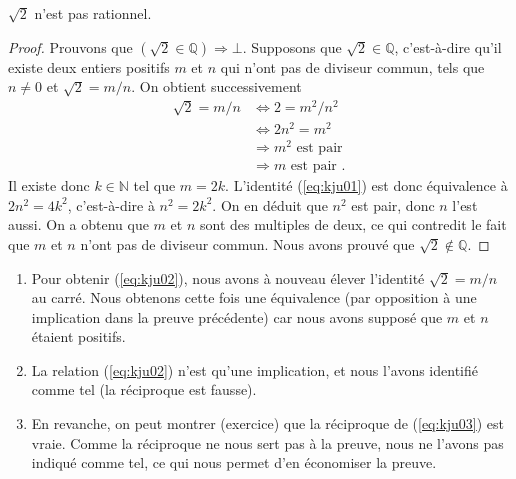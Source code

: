\documentclass[french,course,oneside,theoremnosection]{lecture}
\newcommand{\N}{\mathbb{N}}
\newcommand{\Q}{\mathbb{Q}}
\newcommand{\iimplies}{\Rightarrow}
\newcommand{\ifff}{\Leftrightarrow}
\begin{document}
\begin{example}
$\sqrt{2}$ n'est pas rationnel.
\end{example}
\begin{proof}
Prouvons que $(\sqrt{2} \in \Q) \iimplies \bot$. Supposons que $\sqrt{2}\in \Q$, c'est-à-dire qu'il existe deux entiers positifs $m$ et $n$ qui n'ont pas de diviseur commun, tels que $n\neq 0$ et $\sqrt{2}=m/n$. On obtient successivement
\begin{align}
\sqrt{2}=m/n & \ifff 2=m^2/n^2 \label{eq:kju00}\\
 & \ifff 2n^2=m^2\label{eq:kju01}\\
 & \iimplies m^2 \text{ est pair }\label{eq:kju02}\\
 & \iimplies m \text{ est pair }.\label{eq:kju03}
\end{align}
Il existe donc $k\in \N$ tel que $m=2k$. L'identité (\ref{eq:kju01}) est donc équivalence à 
$
2n^2=4k^2
$, c'est-à-dire à $n^2=2k^2$. On en déduit que $n^2$ est pair, donc $n$ l'est aussi. On a obtenu que $m$ et $n$ sont des multiples de deux, ce qui contredit le fait que $m$ et $n$ n'ont pas de diviseur commun. Nous avons prouvé que $\sqrt{2}\not \in \Q$.
\end{proof}
\begin{remark}
\begin{enumerate}
\item Pour obtenir (\ref{eq:kju02}), nous avons à nouveau élever l'identité $\sqrt{2}=m/n$ au carré. Nous obtenons cette fois une équivalence (par opposition à une implication dans la preuve précédente) car nous avons supposé que $m$ et $n$ étaient positifs.
\item La relation (\ref{eq:kju02}) n'est qu'une implication, et nous l'avons identifié comme tel (la réciproque est fausse).
\item En revanche, on peut montrer (exercice) que la réciproque de (\eqref{eq:kju03}) est vraie. Comme la réciproque ne nous sert pas à la preuve, nous ne l'avons pas indiqué comme tel, ce qui nous permet d'en économiser la preuve.
\end{enumerate}
\end{remark}
\end{document}
